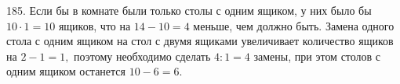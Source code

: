 185. Если бы в комнате были только столы с одним ящиком, у них было бы $10\cdot1=10$ ящиков, что на $14-10=4$ меньше, чем должно быть. Замена одного стола с одним ящиком на стол с двумя ящиками увеличивает количество ящиков на $2-1=1,$ поэтому необходимо сделать $4:1=4$ замены, при этом столов с одним ящиком останется $10-6=6.$\\
